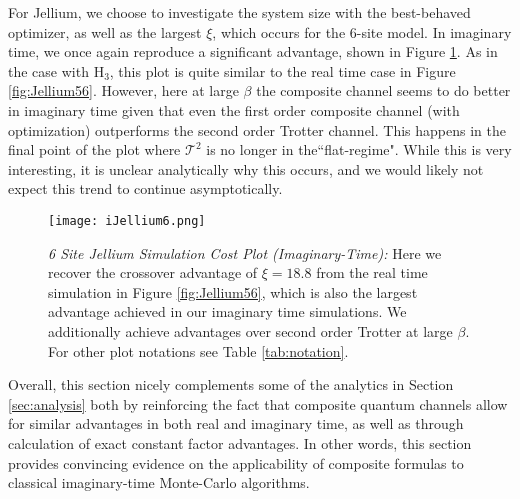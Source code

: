 For Jellium, we choose to investigate the system size with the best-behaved optimizer, as well as the largest $\xi$, which occurs for the 6-site model. In imaginary time, we once again reproduce a significant advantage, shown in Figure \ref{fig:iJellium6}. As in the case with {\rm H$_3$}, this plot is quite similar to the real time case in Figure \ref{fig:Jellium56}. However, here at large $\beta$ the composite channel seems to do better in imaginary time given that even the first order composite channel (with optimization) outperforms the second order Trotter channel. This happens in the final point of the plot where $\mathcal{T}^2$ is no longer in the``flat-regime". While this is very interesting, it is unclear analytically why this occurs, and we would likely not expect this trend to continue asymptotically. 

\begin{figure}[htbp!]
    \centering
    \texttt{[image: iJellium6.png]}
    \caption{\textit{6 Site Jellium Simulation Cost Plot (Imaginary-Time):} Here we recover the  crossover advantage of $\xi = 18.8$ from the real time simulation in Figure \ref{fig:Jellium56}, which is also the largest advantage achieved in our imaginary time simulations. We additionally achieve advantages over second order Trotter at large $\beta$. For other plot notations see Table \ref{tab:notation}.} \label{fig:iJellium6}
\end{figure} 
\FloatBarrier

Overall, this section nicely complements some of the analytics in Section \ref{sec:analysis} both by reinforcing the fact that composite quantum channels allow for similar advantages in both real and imaginary time, as well as through calculation of exact constant factor advantages. In other words, this section provides convincing evidence on the applicability of composite formulas to classical imaginary-time Monte-Carlo algorithms.



